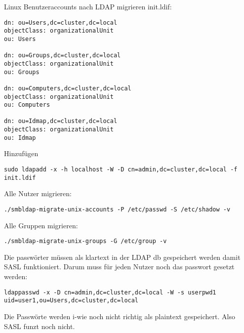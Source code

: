 Linux Benutzeraccounts nach LDAP migrieren
init.ldif:
\begin{lstlisting}[style=Bash]
dn: ou=Users,dc=cluster,dc=local
objectClass: organizationalUnit
ou: Users

dn: ou=Groups,dc=cluster,dc=local
objectClass: organizationalUnit
ou: Groups

dn: ou=Computers,dc=cluster,dc=local
objectClass: organizationalUnit
ou: Computers

dn: ou=Idmap,dc=cluster,dc=local
objectClass: organizationalUnit
ou: Idmap
\end{lstlisting}
Hinzufügen
\begin{lstlisting}[style=Bash]
sudo ldapadd -x -h localhost -W -D cn=admin,dc=cluster,dc=local -f init.ldif
\end{lstlisting}
Alle Nutzer migrieren:
\begin{lstlisting}[style=Bash]
./smbldap-migrate-unix-accounts -P /etc/passwd -S /etc/shadow -v
\end{lstlisting}
Alle Gruppen migrieren:
\begin{lstlisting}[style=Bash]
./smbldap-migrate-unix-groups -G /etc/group -v 
\end{lstlisting}
Die passwörter müssen als klartext in der LDAP db gespeichert werden damit SASL funktioniert. Darum muss für jeden Nutzer noch das passwort gesetzt werden:
\begin{lstlisting}[style=Bash]
ldappasswd -x -D cn=admin,dc=cluster,dc=local -W -s userpwd1 uid=user1,ou=Users,dc=cluster,dc=local 
\end{lstlisting}

Die Passwörte werden i-wie noch nicht richtig als plaintext gespeichert. Also SASL funzt noch nicht.



